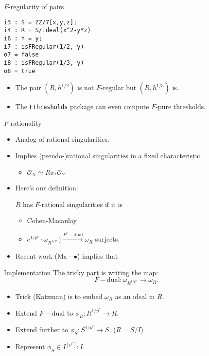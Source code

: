 \documentclass[xcolor=dvipsnames]{beamer}
\renewcommand{\O}{\mbox{$\mathcal{O}$}}
\theoremstyle{remark}
\begin{document}
\begin{frame}[fragile]{$F$-regularity of pairs}
    \begin{verbatim}
i3 : S = ZZ/7[x,y,z];
i4 : R = S/ideal(x^2-y*z)
i6 : h = y;
i7 : isFRegular(1/2, y)
o7 = false
i8 : isFRegular(1/3, y)
o8 = true
    \end{verbatim}
    \begin{itemize}
\item<2->The pair $(R, h^{1/2})$ is not $F$-regular but $(R, h^{1/3})$ is.
\item<3->The {\tt FThresholds} package can even compute $F$-pure thresholds.
\end{itemize}
\end{frame}

\begin{frame}[t]{$F$-rationality}
    \begin{itemize}
        \item<1->  Analog of rational singularities.
        \item<2->  Implies (pseudo-)rational singularities in a fixed characteristic.
        \begin{itemize}
            \item<3->  $\mathcal{O}_X \simeq R \pi_* \O_Y$
        \end{itemize}
        \item<4->  Here's our definition:
        \begin{definition}
            $R$ has $F$-rational singularities if it is
            \begin{itemize}
                \item<5->  Cohen-Macaulay
                \item<6->  $c^{1/p^e} \cdot \omega_{R^{1/p^e}}) \xrightarrow{F^e-\mathrm{dual}} \omega_R$ surjects.
            \end{itemize}
        \end{definition}
        \item<7->  Recent work (Ma - $\bullet$) implies that
    \end{itemize}
\end{frame}

\begin{frame}[t]{Implementation}
    The tricky part is writing the map:
    \[
    F-\mathrm{dual}: \omega_{R^{1/p^e}} \to \omega_R.
    \]
    \begin{itemize}
        \item<2->  Trick (Katzman) is to embed $\omega_R$ as an ideal in $R$.
        \item<3->  Extend $F-\mathrm{dual}$ to $\phi_R : R^{1/p^e} \to R$.
        \item<4->  Extend further to $\phi_S : S^{1/p^e} \to S$.  ($R = S/I$)
        \item<5->  Represent $\phi_S \in I^{[p^e]} : I$.
    \end{itemize}
\end{frame}
\end{document}

